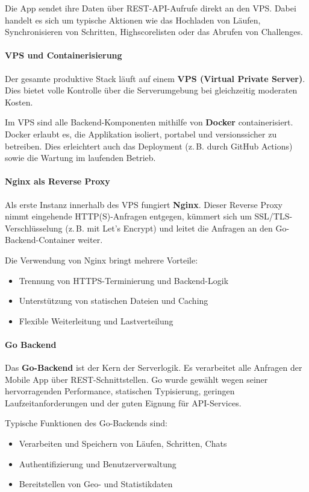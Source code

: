\documentclass[11pt,a4paper]{article}
\begin{document}
Die App sendet ihre Daten  über REST-API-Aufrufe direkt an den VPS. Dabei handelt es sich um typische Aktionen wie das Hochladen von Läufen, Synchronisieren von Schritten, Highscorelisten oder das Abrufen von Challenges.

\paragraph{VPS und Containerisierung}
Der gesamte produktive Stack läuft auf einem \textbf{VPS (Virtual Private Server)}. Dies bietet volle Kontrolle über die Serverumgebung bei gleichzeitig moderaten Kosten.

Im VPS sind alle Backend-Komponenten mithilfe von \textbf{Docker}\cite{docker} containerisiert. Docker erlaubt es, die Applikation isoliert, portabel und versionssicher zu betreiben. Dies erleichtert auch das Deployment (z.\,B. durch GitHub Actions\cite{github}) sowie die Wartung im laufenden Betrieb.

\paragraph{Nginx als Reverse Proxy}
Als erste Instanz innerhalb des VPS fungiert \textbf{Nginx}\cite{nginx}. Dieser Reverse Proxy nimmt eingehende HTTP(S)-Anfragen entgegen, kümmert sich um SSL/TLS-Verschlüsselung (z.\,B. mit Let's Encrypt) und leitet die Anfragen an den Go-Backend-Container weiter.

Die Verwendung von Nginx bringt mehrere Vorteile:
\begin{itemize}
    \item Trennung von HTTPS-Terminierung und Backend-Logik
    \item Unterstützung von statischen Dateien und Caching
    \item Flexible Weiterleitung und Lastverteilung
\end{itemize}

\paragraph{Go Backend}
Das \textbf{Go-Backend} ist der Kern der Serverlogik. Es verarbeitet alle Anfragen der Mobile App über REST-Schnittstellen. Go\cite{golang} wurde gewählt wegen seiner hervorragenden Performance, statischen Typisierung, geringen Laufzeitanforderungen und der guten Eignung für API-Services.

Typische Funktionen des Go-Backends sind:
\begin{itemize}
    \item Verarbeiten und Speichern von Läufen, Schritten, Chats
    \item Authentifizierung und Benutzerverwaltung
    \item Bereitstellen von Geo- und Statistikdaten
\end{itemize}
\end{document}
